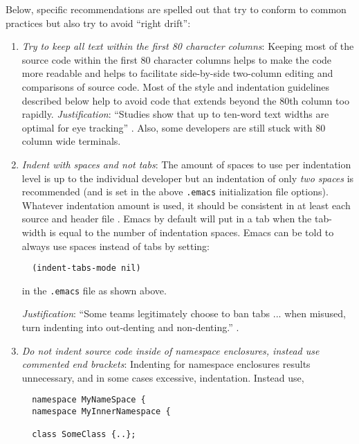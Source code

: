 Below, specific recommendations are spelled out that try to conform to common
practices but also try to avoid ``right drift'':

\begin{enumerate}

{}\item\textit{Try to keep all text within the first 80 character columns}:
Keeping most of the source code within the first 80 character columns helps to
make the code more readable and helps to facilitate side-by-side two-column
editing and comparisons of source code.  Most of the style and indentation
guidelines described below help to avoid code that extends beyond the 80th
column too rapidly. {}\textit{Justification}: ``Studies show that up to
ten-word text widths are optimal for eye tracking'' {}\cite[Item
0]{C++CodingStandards05}.  Also, some developers are still stuck with 80
column wide terminals.

{}\item\textit{Indent with spaces and not tabs}: The amount of spaces to use
per indentation level is up to the individual developer but an indentation of
only {}\textit{two spaces} is recommended (and is set in the above
{}\texttt{.emacs} initialization file options).  Whatever indentation amount
is used, it should be consistent in at least each source and header file
{}\cite[Item 0]{C++CodingStandards05}.  Emacs by default will put in a tab
when the tab-width is equal to the number of indentation spaces.  Emacs can be
told to always use spaces instead of tabs by setting:

{\small\begin{verbatim}
  (indent-tabs-mode nil)
\end{verbatim}}

in the {}\texttt{.emacs} file as shown above.

{}\textit{Justification}: ``Some teams legitimately choose to ban tabs
... when misused, turn indenting into out-denting and non-denting.''
{}\cite{C++CodingStandards05}.

{}\item\textit{Do not indent source code inside of namespace enclosures,
instead use commented end brackets}: Indenting for namespace enclosures
results unnecessary, and in some cases excessive, indentation.  Instead use,

{\small\begin{verbatim}
  namespace MyNameSpace {
  namespace MyInnerNamespace {

  class SomeClass {..};


\end{verbatim}}
\end{enumerate}
